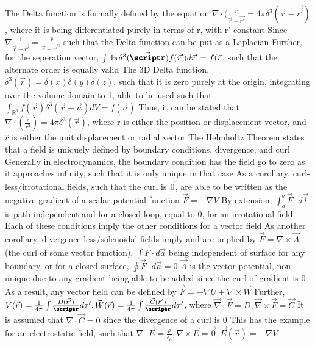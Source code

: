 \documentclass[11 pt, twoside]{article}
\newenvironment{outline*}
{
	\begin{outline}[enumerate]
	}
	{\end{outline}
}
\begin{document}
\begin{outline*}
		\3 The Delta function is formally defined by the equation $\nabla \cdot (\frac{\hat{r}}{\vec{r} - \vec{r'}} = 4\pi\delta^3(\vec{r} - \vec{r'})$, where it is being differentiated purely in terms of r, with r' constant
			\4 Since $\nabla \frac{1}{\vec{r} - \vec{r'}} = \frac{-\hat{r}}{\vec{r} - \vec{r'}}$, such that the Delta function can be put as a Laplacian
			\4 Further, for the seperation vector, $\int 4\pi\delta^3(\vec{\pmb{\scriptr}})f(\vec{r}')d\vec{r}' = f(\vec{r}$, such that the alternate order is equally valid
	\2 The 3D Delta function, $\delta^3(\vec{r}) = \delta(x)\delta(y)\delta(z)$, such that it is zero purely at the origin, integrating over the volume domain to 1, able to be used such that $\int_{\mathbb{R}^3} f(\vec{r})\delta^3(\vec{r} - \vec{a})dV = f(\vec{a})$
		\3 Thus, it can be stated that $\nabla \cdot (\frac{\hat{r}}{r^2}) = 4\pi\delta^3(\vec{r})$, where r is either the position or displacement vector, and $\hat{r}$ is either the unit displacement or radial vector
\1 The Helmholtz Theorem states that a field is uniquely defined by boundary conditions, divergence, and curl
	\2 Generally in electrodynamics, the boundary condition has the field go to zero as it approaches infinity, such that it is only unique in that case
	\2 As a corollary, curl-less/irrotational fields, such that the curl is $\vec{0}$, are able to be written as the negative gradient of a scalar potential function $\vec{F} = -\nabla V$
		\3 By extension, $\int^b_a \vec{F} \cdot d\vec{l}$ is path independent and for a closed loop, equal to 0, for an irrotational field
		\3 Each of these conditions imply the other conditions for a vector field
	\2 As another corollary, divergence-less/solenoidal fields imply and are implied by $\vec{F} = \nabla \times \vec{A}$ (the curl of some vector function), $\int \vec{F} \cdot d\vec{a}$ being independent of surface for any boundary, or for a closed surface, $\oint \vec{F} \cdot d\vec{a} = 0$
		\3 $\vec{A}$ is the vector potential, non-unique due to any gradient being able to be added since the curl of gradient is 0
	\2 As a result, any vector field can be defined by $\vec{F} = -\nabla U + \nabla \times \vec{W}$
		\3 Further, $V(\vec{r}) = \frac{1}{4\pi} \int \frac{D(\vec{r'})}{\pmb{\scriptr}}d\tau', \vec{W}(\vec{r}) = \frac{1}{4\pi} \int \frac{\vec{C}(\vec{r}')}{\pmb{\scriptr}}d\tau'$, where $\vec{\nabla} \cdot \vec{F} = D, \vec{\nabla} \times \vec{F} = \vec{C}$
			\4 It is assumed that $\nabla \cdot \vec{C} = 0$ since the divergence of a curl is 0
	\2 This has the example for an electrostatic field, such that $\nabla \cdot \vec{E} = \frac{\rho}{\epsilon_0}, \nabla \times \vec{E} = \vec{0}, \vec{E}(\vec{r}) = -\nabla V$

\end{outline*}
\end{document}
